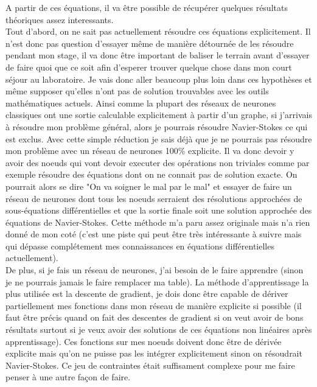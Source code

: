 \documentclass[12pt]{article}
\begin{document}
A partir de ces équations, il va être possible de récupérer quelques résultats théoriques assez interessants.\\ Tout d'abord, on ne sait pas actuellement résoudre ces équations explicitement. Il n'est donc pas question d'essayer même de manière détournée de les résoudre pendant mon stage, il va donc être important de baliser le terrain avant d'essayer de faire quoi que ce soit afin d'esperer trouver quelque chose dans mon court séjour au laboratoire. Je vais donc aller beaucoup plus loin dans ces hypothèses et même supposer qu'elles n'ont pas de solution trouvables avec les outils mathématiques actuels. Ainsi comme la plupart des réseaux de neurones classiques ont une sortie calculable explicitement à partir d'un graphe, si j'arrivais à résoudre mon problème général, alors je pourrais résoudre Navier-Stokes ce qui est exclus. Avec cette simple réduction je sais déjà que je ne pourrais pas résoudre mon problème avec un réseau de neurones 100\% explicite. Il va donc devoir y avoir des noeuds qui vont devoir executer des opérations non triviales comme par exemple résoudre des équations dont on ne connait pas de solution exacte. On pourrait alors se dire "On va soigner le mal par le mal" et essayer de faire un réseau de neurones dont tous les noeuds serraient des résolutions approchées de sous-équations différentielles et que la sortie finale soit une solution approchée des équations de Navier-Stokes. Cette méthode m'a paru assez originale mais n'a rien donné de mon coté (c'est une piste qui peut être très intéressante à suivre mais qui dépasse complétement mes connaissances en équations différentielles actuellement). \\
De plus, si je fais un réseau de neurones, j'ai besoin de le faire apprendre (sinon je ne pourrais jamais le faire remplacer ma table). La méthode d'apprentissage la plus utilisée est la descente de gradient, je dois donc être capable de dériver partiellement mes fonctions dans mon réseau de manière explicite si possible (il faut être précis quand on fait des descentes de gradient si on veut avoir de bons résultats surtout si je veux avoir des solutions de ces équations non linéaires après apprentissage). Ces fonctions sur mes noeuds doivent donc être de dérivée explicite mais qu'on ne puisse pas les intégrer explicitement sinon on résoudrait Navier-Stokes. Ce jeu de contraintes était suffisament complexe pour me faire penser à une autre façon de faire.
\end{document}
